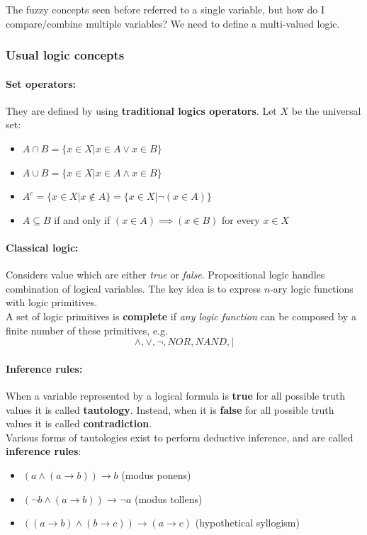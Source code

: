 The fuzzy concepts seen before referred to a single variable, but how do I compare/combine multiple variables? We need to define a multi-valued logic.\\

\subsubsection{Usual logic concepts}

\paragraph{Set operators:} They are defined by using \textbf{traditional logics operators}. Let $X$ be the universal set: 
\begin{itemize}
	\item $A \cap B = \{x \in X | x \in A \vee x \in B\}$
	\item $A \cup B = \{x \in X | x \in A \wedge x \in B\}$
	\item $A^c = \{x \in X | x \notin A\} = \{x \in X | \neg (x \in A)\}$
	\item $A \subseteq B$ if and only if $(x \in A) \implies (x \in B)$ for every $x \in X$
\end{itemize}

\paragraph{Classical logic:} Considers value which are either \textit{true} or \textit{false}. Propositional logic handles combination of logical variables. The key idea is to express $n$-ary logic functions with logic primitives. \\

A set of logic primitives is \textbf{complete} if \textit{any logic function} can be composed by a finite number of these primitives, e.g.
$$ \wedge, \vee, \neg, NOR, NAND, | $$

\paragraph{Inference rules:} When a variable represented by a logical formula is \textbf{true} for all possible truth values it is called \textbf{tautology}. Instead, when it is \textbf{false} for all possible truth values it is called \textbf{contradiction}. \\

Various forms of tautologies exist to perform deductive inference, and are called \textbf{inference rules}:
\begin{itemize}[label*=]
	\item $(a \wedge (a \rightarrow b)) \rightarrow b$ (modus ponens)
	\item $(\neg b \wedge (a \rightarrow b)) \rightarrow \neg a$ (modus tollens)
	\item $((a \rightarrow b) \wedge (b \rightarrow c)) \rightarrow (a \rightarrow c)$ (hypothetical syllogism)
\end{itemize}

